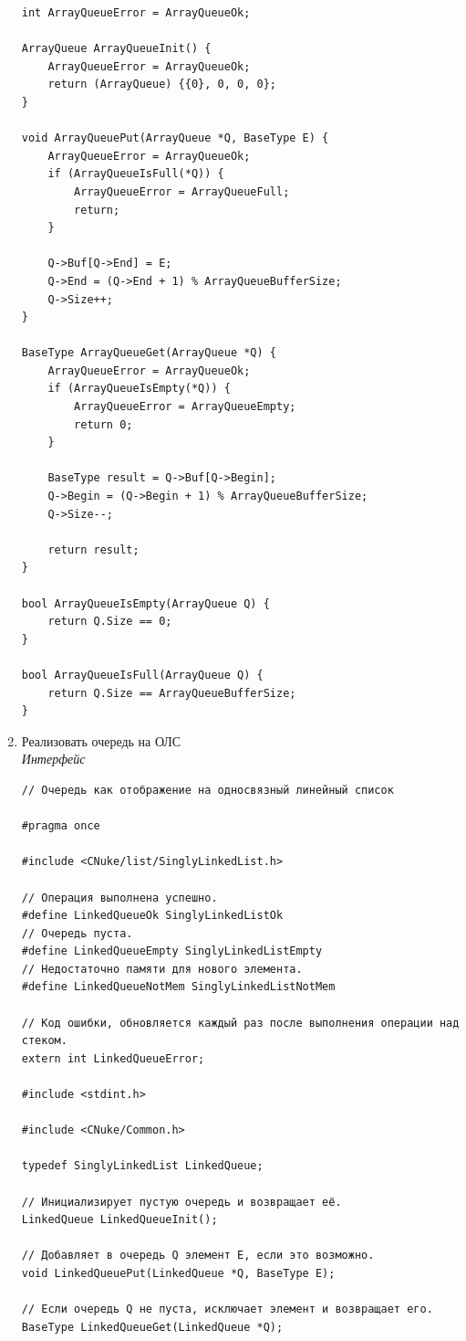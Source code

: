 \documentclass[a4paper,14pt]{extarticle}
\begin{document}
\begin{enumerate}
\begin{verbatim}
int ArrayQueueError = ArrayQueueOk;

ArrayQueue ArrayQueueInit() {
    ArrayQueueError = ArrayQueueOk;
    return (ArrayQueue) {{0}, 0, 0, 0};
}

void ArrayQueuePut(ArrayQueue *Q, BaseType E) {
    ArrayQueueError = ArrayQueueOk;
    if (ArrayQueueIsFull(*Q)) {
        ArrayQueueError = ArrayQueueFull;
        return;
    }

    Q->Buf[Q->End] = E;
    Q->End = (Q->End + 1) % ArrayQueueBufferSize;
    Q->Size++; 
}

BaseType ArrayQueueGet(ArrayQueue *Q) {
    ArrayQueueError = ArrayQueueOk;
    if (ArrayQueueIsEmpty(*Q)) {
        ArrayQueueError = ArrayQueueEmpty;
        return 0;
    }

    BaseType result = Q->Buf[Q->Begin];
    Q->Begin = (Q->Begin + 1) % ArrayQueueBufferSize;
    Q->Size--;

    return result; 
}

bool ArrayQueueIsEmpty(ArrayQueue Q) {
    return Q.Size == 0;
}

bool ArrayQueueIsFull(ArrayQueue Q) {
    return Q.Size == ArrayQueueBufferSize;
}
    \end{verbatim}
    \item Реализовать очередь на ОЛС\\
	\textit{Интерфейс}
    \begin{verbatim}
// Очередь как отображение на односвязный линейный список

#pragma once

#include <CNuke/list/SinglyLinkedList.h>

// Операция выполнена успешно.
#define LinkedQueueOk SinglyLinkedListOk
// Очередь пуста.
#define LinkedQueueEmpty SinglyLinkedListEmpty
// Недостаточно памяти для нового элемента.
#define LinkedQueueNotMem SinglyLinkedListNotMem

// Код ошибки, обновляется каждый раз после выполнения операции над стеком.
extern int LinkedQueueError;

#include <stdint.h>

#include <CNuke/Common.h>

typedef SinglyLinkedList LinkedQueue;

// Инициализирует пустую очередь и возвращает её.
LinkedQueue LinkedQueueInit();

// Добавляет в очередь Q элемент E, если это возможно.
void LinkedQueuePut(LinkedQueue *Q, BaseType E);

// Если очередь Q не пуста, исключает элемент и возвращает его.
BaseType LinkedQueueGet(LinkedQueue *Q);


\end{verbatim}
\end{enumerate}
\end{document}
